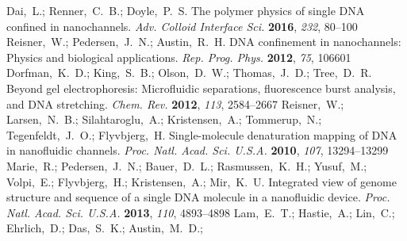 \documentclass[journal=mamobx,manuscript=article,layout=twocolumn]{achemso}
\begin{document}
\begin{mcitethebibliography}{52}
Dai,~L.; Renner,~C.~B.; Doyle,~P.~S. The polymer physics of single DNA confined
  in nanochannels. \emph{Adv. Colloid Interface Sci.} \textbf{2016},
  \emph{232}, 80--100\relax
\mciteBstWouldAddEndPuncttrue
\mciteSetBstMidEndSepPunct{\mcitedefaultmidpunct}
{\mcitedefaultendpunct}{\mcitedefaultseppunct}\relax
\EndOfBibitem
{}
Reisner,~W.; Pedersen,~J.~N.; Austin,~R.~H. DNA confinement in nanochannels:
  Physics and biological applications. \emph{Rep. Prog. Phys.} \textbf{2012},
  \emph{75}, 106601\relax
\mciteBstWouldAddEndPuncttrue
\mciteSetBstMidEndSepPunct{\mcitedefaultmidpunct}
{\mcitedefaultendpunct}{\mcitedefaultseppunct}\relax
\EndOfBibitem
{}
Dorfman,~K.~D.; King,~S.~B.; Olson,~D.~W.; Thomas,~J.~D.; Tree,~D.~R. Beyond
  gel electrophoresis: Microfluidic separations, fluorescence burst analysis,
  and DNA stretching. \emph{Chem. Rev.} \textbf{2012}, \emph{113},
  2584--2667\relax
\mciteBstWouldAddEndPuncttrue
\mciteSetBstMidEndSepPunct{\mcitedefaultmidpunct}
{\mcitedefaultendpunct}{\mcitedefaultseppunct}\relax
\EndOfBibitem
{}
Reisner,~W.; Larsen,~N.~B.; Silahtaroglu,~A.; Kristensen,~A.; Tommerup,~N.;
  Tegenfeldt,~J.~O.; Flyvbjerg,~H. Single-molecule denaturation mapping of DNA
  in nanofluidic channels. \emph{Proc. Natl. Acad. Sci. U.S.A.} \textbf{2010},
  \emph{107}, 13294--13299\relax
\mciteBstWouldAddEndPuncttrue
\mciteSetBstMidEndSepPunct{\mcitedefaultmidpunct}
{\mcitedefaultendpunct}{\mcitedefaultseppunct}\relax
\EndOfBibitem
{}
Marie,~R.; Pedersen,~J.~N.; Bauer,~D.~L.; Rasmussen,~K.~H.; Yusuf,~M.;
  Volpi,~E.; Flyvbjerg,~H.; Kristensen,~A.; Mir,~K.~U. Integrated view of
  genome structure and sequence of a single DNA molecule in a nanofluidic
  device. \emph{Proc. Natl. Acad. Sci. U.S.A.} \textbf{2013}, \emph{110},
  4893--4898\relax
\mciteBstWouldAddEndPuncttrue
\mciteSetBstMidEndSepPunct{\mcitedefaultmidpunct}
{\mcitedefaultendpunct}{\mcitedefaultseppunct}\relax
\EndOfBibitem
{}
Lam,~E.~T.; Hastie,~A.; Lin,~C.; Ehrlich,~D.; Das,~S.~K.; Austin,~M.~D.;

\end{mcitethebibliography}
\end{document}

